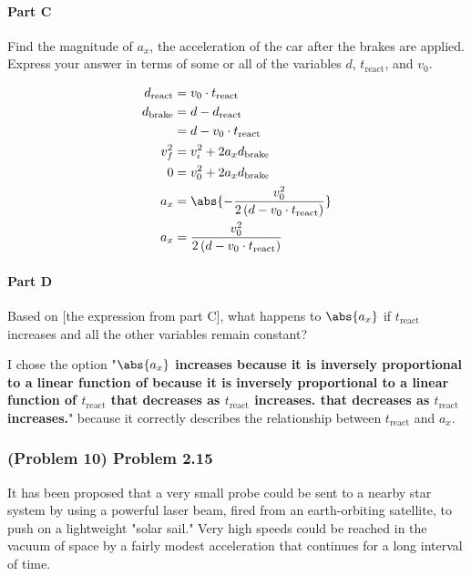 \paragraph{Part C}
Find the magnitude of $a_x$, the acceleration of the car after the brakes are applied. Express your answer in terms of some or all of the variables $d$, $t_{\mathrm{react}}$, and $v_0$.

\begin{solution}
	\begin{align*}
		d_{\mathrm{react}} &= v_0 \cdot t_{\mathrm{react}} \\
		d_{\mathrm{brake}} &= d-d_{\mathrm{react}} \\
		&= d-v_0 \cdot t_{\mathrm{react}} \\
		v_{f}^2 &= v_{i}^2 + 2a_{x}d_{\mathrm{brake}} \\
		0 &= v_0^2 + 2a_{x}d_{\mathrm{brake}} \\
		a_{x} &= \abs{ - \frac{v_0^2}{2 \left( d-v_0 \cdot t_{\mathrm{react}} \right)} }  \\
		a_{x} &= \frac{v_0^2}{2 \left( d-v_0 \cdot t_{\mathrm{react}} \right)} \\
	\end{align*}
\end{solution}

\paragraph{Part D}
Based on [the expression from part C], what happens to $\abs{ a_{x} }$ if $t_{\mathrm{react}}$ increases and all the other variables remain constant?

\begin{solution}
	I chose the option "\textbf{$\abs{ a_x }$ increases because it is inversely proportional to a linear function of because it is inversely proportional to a linear function of  $t_{\mathrm{react}}$ that decreases as  $t_{\mathrm{react}}$ increases. that decreases as $t_{\mathrm{react}}$ increases.}" because it correctly describes the relationship between $t_{\mathrm{react}}$ and $a_{x}$.
\end{solution}

\newpage

\subsubsection{(Problem 10) Problem 2.15}
It has been proposed that a very small probe could be sent to a nearby star system by using a powerful laser beam, fired from an earth-orbiting satellite, to push on a lightweight "solar sail." Very high speeds could be reached in the vacuum of space by a fairly modest acceleration that continues for a long interval of time.

